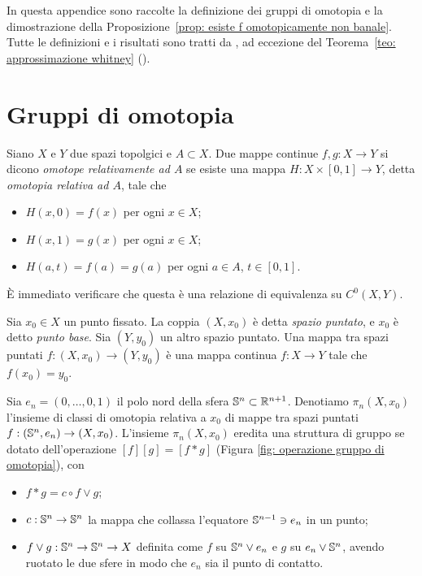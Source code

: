 
In questa appendice sono raccolte la definizione dei gruppi di omotopia e la dimostrazione della Proposizione~\ref{prop: esiste f omotopicamente non banale}. Tutte le definizioni e i risultati sono tratti da \cite{hatcher2000algebraic}, ad eccezione del Teorema~\ref{teo: approssimazione whitney} (\cite[Theorem~6.19]{lee2012smooth}).

\section{Gruppi di omotopia}

Siano \(X\) e \(Y\) due spazi topolgici e \(A \subset X\). Due mappe continue \(f,g:X \to Y\) si dicono \textit{omotope relativamente ad \(A\)} se esiste una mappa \(H:X \times [0,1] \to Y\), detta \textit{omotopia relativa ad \(A\)}, tale che
\begin{itemize}
	\item \(H(x,0) = f(x)\) per ogni \(x \in X\);
	\item \(H(x,1) = g(x)\) per ogni \(x \in X\);
	\item \(H(a,t) = f(a) = g(a)\) per ogni \(a \in A\), \(t \in [0,1]\).
\end{itemize}
È immediato verificare che questa è una relazione di equivalenza su \(C^0(X,Y)\).

Sia \(x_0 \in X\) un punto fissato. La coppia \((X,x_0)\) è detta \textit{spazio puntato}, e \(x_0\) è detto \textit{punto base}. Sia \((Y,y_0)\) un altro spazio puntato. Una mappa tra spazi puntati \(f:(X,x_0) \to (Y,y_0)\) è una mappa continua \(f : X \to Y\) tale che \(f(x_0)=y_0\).

Sia  \(e_n =(0,\dots,0,1)\) il polo nord della sfera \(\mathbb{S}^n \subset \mathbb{R}^{n+1}\). Denotiamo \(\pi_n(X,x_0)\) l'insieme di classi di omotopia relativa a \({x_0}\) di mappe tra spazi puntati \(f:(\mathbb{S}^n,e_n) \to (X,x_0)\). L'insieme \(\pi_n(X,x_0)\) eredita una struttura di gruppo se dotato dell'operazione \([f][g]=[f*g]\) (Figura \ref{fig: operazione gruppo di omotopia}), con
\begin{itemize}
	\item  \(f*g=c \circ f \vee g\);
	\item \(c:\mathbb{S}^n \to \mathbb{S}^n \) la mappa che collassa l'equatore \(\mathbb{S}^{n-1} \owns e_n\) in un punto;
	\item \(f \vee g : \mathbb{S}^n \to \mathbb{S}^n \to X\) definita come \(f\) su \(\mathbb{S}^n \vee e_n\) e \(g\) su \(e_n \vee \mathbb{S}^n\), avendo ruotato le due sfere in modo che \(e_n\) sia il punto di contatto.
\end{itemize} 

